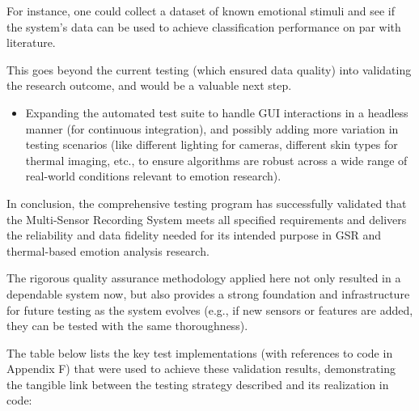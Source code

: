{{{{{{{{{{{{{{{{For instance, one could collect a dataset of known emotional stimuli and see if the system's data can be used to achieve classification performance on par with literature.

This goes beyond the current testing (which ensured data quality) into validating the research outcome, and would be a valuable next step.

\begin{itemize}
 
\item Expanding the automated test suite to handle GUI interactions in a headless manner (for continuous integration), and possibly adding more variation in testing scenarios (like different lighting for cameras, different skin types for thermal imaging, etc., to ensure algorithms are robust across a wide range of real-world conditions relevant to emotion research).

\end{itemize}

In conclusion, the comprehensive testing program has successfully validated that the Multi-Sensor Recording System meets all specified requirements and delivers the reliability and data fidelity needed for its intended purpose in GSR and thermal-based emotion analysis research.

The rigorous quality assurance methodology applied here not only resulted in a dependable system now, but also provides a strong foundation and infrastructure for future testing as the system evolves (e.g., if new sensors or features are added, they can be tested with the same thoroughness).

The table below lists the key test implementations (with references to code in Appendix F) that were used to achieve these validation results, demonstrating the tangible link between the testing strategy described and its realization in code: \begin{itemize}
 

\end{itemize}}}}}}}}}}}}}}}}}
